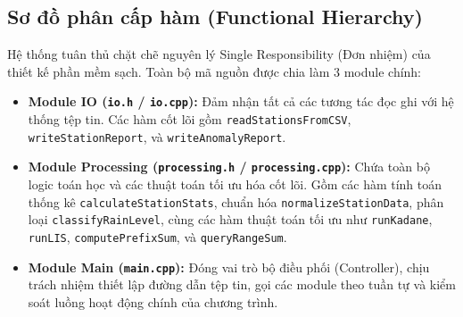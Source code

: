 \subsection{Sơ đồ phân cấp hàm (Functional Hierarchy)}
Hệ thống tuân thủ chặt chẽ nguyên lý Single Responsibility (Đơn nhiệm) của thiết kế phần mềm sạch. Toàn bộ mã nguồn được chia làm 3 module chính:
\begin{itemize}
    \item \textbf{Module IO (\texttt{io.h} / \texttt{io.cpp}):} Đảm nhận tất cả các tương tác đọc ghi với hệ thống tệp tin. Các hàm cốt lõi gồm \texttt{readStationsFromCSV}, \texttt{writeStationReport}, và \texttt{writeAnomalyReport}.
    \item \textbf{Module Processing (\texttt{processing.h} / \texttt{processing.cpp}):} Chứa toàn bộ logic toán học và các thuật toán tối ưu hóa cốt lõi. Gồm các hàm tính toán thống kê \texttt{calculateStationStats}, chuẩn hóa \texttt{normalizeStationData}, phân loại \texttt{classifyRainLevel}, cùng các hàm thuật toán tối ưu như \texttt{runKadane}, \texttt{runLIS}, \texttt{computePrefixSum}, và \texttt{queryRangeSum}.
    \item \textbf{Module Main (\texttt{main.cpp}):} Đóng vai trò bộ điều phối (Controller), chịu trách nhiệm thiết lập đường dẫn tệp tin, gọi các module theo tuần tự và kiểm soát luồng hoạt động chính của chương trình.
\end{itemize}
